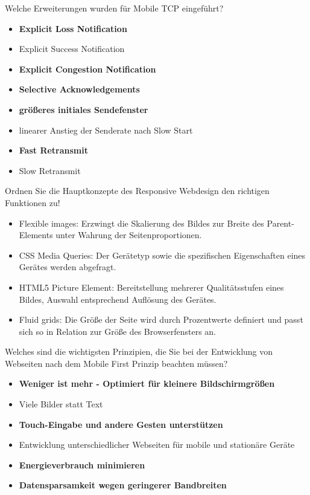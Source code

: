 \documentclass{article}
\begin{document}
	Welche Erweiterungen wurden für Mobile TCP eingeführt?
	\begin{itemize}
		\item \textbf{Explicit Loss Notification}
		\item Explicit Success Notification
		\item \textbf{Explicit Congestion Notification}
		\item \textbf{Selective Acknowledgements}
		\item \textbf{größeres initiales Sendefenster}
		\item linearer Anstieg der Senderate nach Slow Start
		\item \textbf{Fast Retransmit}
		\item Slow Retransmit
	\end{itemize}

	Ordnen Sie die Hauptkonzepte des Responsive Webdesign den richtigen Funktionen zu! 
	\begin{itemize}
		\item Flexible images: Erzwingt die Skalierung des Bildes zur Breite des Parent-Elements unter Wahrung der Seitenproportionen. 
		\item CSS Media Queries: Der Gerätetyp sowie die spezifischen Eigenschaften eines Gerätes werden abgefragt. 
		\item HTML5 Picture Element: Bereitstellung mehrerer Qualitätsstufen eines Bildes, Auswahl entsprechend Auflösung des Gerätes. 
		\item Fluid grids: Die Größe der Seite wird durch Prozentwerte definiert und passt sich so in Relation zur Größe des Browserfensters an. 
	\end{itemize}
	
	Welches sind die wichtigsten Prinzipien, die Sie bei der Entwicklung von Webseiten nach dem Mobile First Prinzip beachten müssen? 
	\begin{itemize}
		\item \textbf{Weniger ist mehr - Optimiert für kleinere Bildschirmgrößen}
		\item Viele Bilder statt Text
		\item \textbf{Touch-Eingabe und andere Gesten unterstützen}
		\item Entwicklung unterschiedlicher Webseiten für mobile und stationäre Geräte
		\item \textbf{Energieverbrauch minimieren}
		\item \textbf{Datensparsamkeit wegen geringerer Bandbreiten}
	\end{itemize}
	
\end{document}
